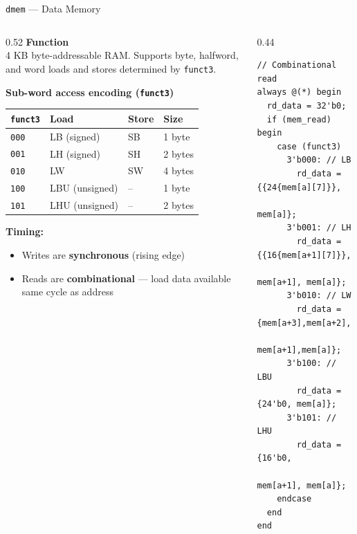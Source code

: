 \documentclass[aspectratio=169,10pt]{beamer}
\begin{document}
\begin{frame}[fragile]{\texttt{dmem} --- Data Memory}
  \begin{columns}[T]
    \begin{column}{0.52\textwidth}
      \textbf{Function}\\
      4 KB byte-addressable RAM. Supports byte, halfword, and word loads and stores determined by \texttt{funct3}.

      \vspace{0.5em}
      \textbf{Sub-word access encoding (\texttt{funct3})}
      \renewcommand{\arraystretch}{1.15}
      \scriptsize
      \begin{tabular}{llll}
        \toprule
        \texttt{funct3} & Load & Store & Size \\
        \midrule
        \texttt{000} & LB (signed)    & SB & 1 byte \\
        \texttt{001} & LH (signed)    & SH & 2 bytes \\
        \texttt{010} & LW             & SW & 4 bytes \\
        \texttt{100} & LBU (unsigned) & -- & 1 byte \\
        \texttt{101} & LHU (unsigned) & -- & 2 bytes \\
        \bottomrule
      \end{tabular}

      \vspace{0.5em}
      \small\textbf{Timing:}
      \begin{itemize}\small
        \item Writes are \textbf{synchronous} (rising edge)
        \item Reads are \textbf{combinational} --- load data available same cycle as address
      \end{itemize}
    \end{column}
    \begin{column}{0.44\textwidth}
\begin{lstlisting}
// Combinational read
always @(*) begin
  rd_data = 32'b0;
  if (mem_read) begin
    case (funct3)
      3'b000: // LB
        rd_data = {{24{mem[a][7]}},
                   mem[a]};
      3'b001: // LH
        rd_data = {{16{mem[a+1][7]}},
                   mem[a+1], mem[a]};
      3'b010: // LW
        rd_data = {mem[a+3],mem[a+2],
                   mem[a+1],mem[a]};
      3'b100: // LBU
        rd_data = {24'b0, mem[a]};
      3'b101: // LHU
        rd_data = {16'b0,
                   mem[a+1], mem[a]};
    endcase
  end
end
\end{lstlisting}
    \end{column}
  \end{columns}
\end{frame}
\end{document}
